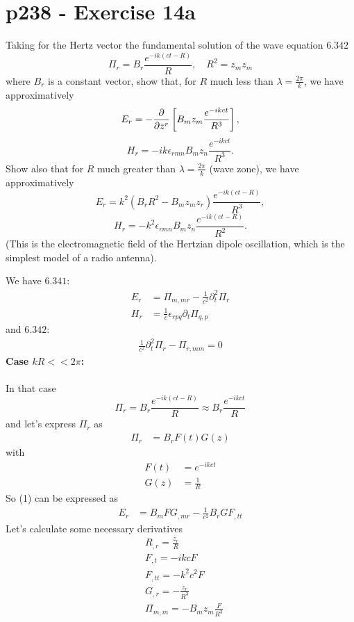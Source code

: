 \section{p238 - Exercise 14a}
\begin{tcolorbox}
Taking for the Hertz vector the fundamental solution of the wave equation $\mathbf{6.342}$
$$\Pi_r=B_r\frac{e^{-ik\left(ct-R\right)}}{R},\quad R^2=z_mz_m$$
where $B_r$ is a constant vector, show that, for $R$ much less than $\lambda=\frac{2\pi}{k}$, we have approximatively
$$E_r= -\pdv{}{z^r}\left[B_mz_m\frac{e^{-ikct}}{R^3}\right],$$
$$H_r= -ik\epsilon_{rmn}B_mz_n\frac{e^{-ikct}}{R^3}.$$
Show also that for $R$ much greater than $\lambda=\frac{2\pi}{k}$ (wave zone), we have approximatively
$$E_r= k^2\left(B_rR^2-B_mz_mz_r\right)\frac{e^{-ik(ct-R)}}{R^3},$$
$$H_r= -k^2\epsilon_{rmn}B_mz_n\frac{e^{-ik(ct-R)}}{R^2}.$$
(This is the electromagnetic field of the Hertzian dipole oscillation, which is the simplest model of a radio antenna).
\end{tcolorbox}
We have $\mathbf{6.341}$:
\begin{align}
E_r&= \Pi_{m,mr}-\frac{1}{c^2}\partial^2_t\Pi_r\\
H_r&= \frac{1}{c}\epsilon_{rpq}\partial_t\Pi_{q,p}
\end{align}
and $\mathbf{6.342}$:
\begin{align}
\frac{1}{c^2}\partial^2_t\Pi_r-\Pi_{r,mm}=0
\end{align}
\textbf{Case $kR<<2\pi$:}\\\\
In that case $$\Pi_r=B_r\frac{e^{-ik\left(ct-R\right)}}{R} \approx B_r\frac{e^{-ikct}}{R}$$
and let's express $\Pi_r$ as 
\begin{align}
\Pi_r&= B_rF(t)G(z)
\end{align}
with
\\
\begin{align}
F(t)&=e^{-ikct}\\
G(z)&= \frac{1}{R}
\end{align}
So (1) can be expressed as 
\begin{align}
E_r&= B_mFG_{,mr}-\frac{1}{c^2}B_rGF_{,tt}
\end{align}
Let's calculate some necessary derivatives
\begin{align}
&R_{,r} = \frac{z_r}{R}\\
&F_{,t}= -ikcF\\
&F_{,tt}= -k^2c^2F\\
&G_{,r} = -\frac{z_r}{R^3}\\
&\Pi_{m,m} = -B_mz_m\frac{F}{R^3}
\end{align}
